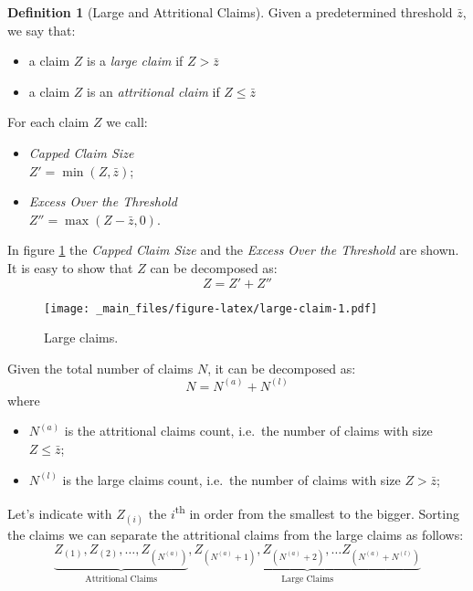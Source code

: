 \documentclass[a4paper, nobind]{templates/ociamthesis}
\providecommand{\tightlist}{%
  \setlength{\itemsep}{0pt}\setlength{\parskip}{0pt}}
\theoremstyle{definition}
\newtheorem{definition}{Definition}[chapter]
\theoremstyle{definition}
\theoremstyle{definition}
\theoremstyle{remark}
\begin{document}
\begin{definition}[Large and Attritional Claims]
\label{def:def-large-claim} \iffalse (Large and Attritional Claims) \fi{} Given a predetermined threshold \(\bar{z}\), we say that:

\begin{itemize}
\item a claim $Z$ is a \textit{large claim} if $Z > \bar{z}$
\item a claim $Z$ is an \textit{attritional claim} if $Z \le \bar{z}$
\end{itemize}

For each claim \(Z\) we call:

\begin{itemize}
\item \textit{Capped Claim Size} \\
      $Z' = \min(Z, \bar{z})$;
\item \textit{Excess Over the Threshold} \\
      $Z'' = \max(Z - \bar{z}, 0)$.
\end{itemize}
\end{definition}

In figure \ref{fig:large-claim} the \emph{Capped Claim Size} and the \emph{Excess Over the Threshold} are shown. It is easy to show that \(Z\) can be decomposed as:
\[Z = Z' + Z''\]

\begin{figure}
\centering
\texttt{[image: \_main\_files/figure-latex/large-claim-1.pdf]}
\caption{\label{fig:large-claim}Large claims.}
\end{figure}

Given the total number of claims \(N\), it can be decomposed as:
\[N = N^{(a)} + N^{(l)}\]
where

\begin{itemize}
\tightlist
\item
  \(N^{(a)}\) is the attritional claims count, i.e.~the number of claims with size \(Z \le \bar{z}\);
\item
  \(N^{(l)}\) is the large claims count, i.e.~the number of claims with size \(Z > \bar{z}\);
\end{itemize}

Let's indicate with \(Z_{(i)}\) the \(i\)\textsuperscript{th} in order from the smallest to the bigger. Sorting the claims we can separate the attritional claims from the large claims as follows:
\[
\underbrace{Z_{(1)}, Z_{(2)}, \dots, Z_{(N^{(a)})}}_{\text{Attritional Claims}},
\underbrace{Z_{(N^{(a)} + 1)}, Z_{(N^{(a)} + 2)}, \dots Z_{(N^{(a)} + N^{(l)})}}_{\text{Large Claims}}
\]
\end{document}

